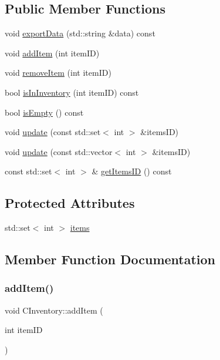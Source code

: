 \subsection*{Public Member Functions}
\begin{DoxyCompactItemize}
\item 
void \mbox{\hyperlink{class_c_inventory_aaf1332bfb30866845bbcae69e411e4bc}{export\+Data}} (std\+::string \&data) const
\item 
void \mbox{\hyperlink{class_c_inventory_aee94ee18f40ea685f640a15f8f6f75b9}{add\+Item}} (int item\+ID)
\item 
void \mbox{\hyperlink{class_c_inventory_a0df34d3e77a17faa6585c11611258135}{remove\+Item}} (int item\+ID)
\item 
bool \mbox{\hyperlink{class_c_inventory_abd92c94b31dc928c1047423e98309bd7}{is\+In\+Inventory}} (int item\+ID) const
\item 
bool \mbox{\hyperlink{class_c_inventory_a3fe6ee0c2de70f3e2d9278e43f125fe9}{is\+Empty}} () const
\item 
void \mbox{\hyperlink{class_c_inventory_a2ae39f69247c25fa2ee46c4111bcce56}{update}} (const std\+::set$<$ int $>$ \&items\+ID)
\item 
void \mbox{\hyperlink{class_c_inventory_a0e551d2fbd87a61bb2b56ce58cacbe1f}{update}} (const std\+::vector$<$ int $>$ \&items\+ID)
\item 
const std\+::set$<$ int $>$ \& \mbox{\hyperlink{class_c_inventory_a473699b2949d4c6c19853f5047fa7737}{get\+Items\+ID}} () const
\end{DoxyCompactItemize}
\subsection*{Protected Attributes}
\begin{DoxyCompactItemize}
\item 
std\+::set$<$ int $>$ \mbox{\hyperlink{class_c_inventory_a6e8d618c0236a8221a876466b53e4ddb}{items}}
\end{DoxyCompactItemize}


\subsection{Member Function Documentation}
\mbox{\label{class_c_inventory_aee94ee18f40ea685f640a15f8f6f75b9}} 
\subsubsection{\texorpdfstring{add\+Item()}{addItem()}}
{\footnotesize\ttfamily void C\+Inventory\+::add\+Item (\begin{DoxyParamCaption}\item[{int}]{item\+ID }\end{DoxyParamCaption})\hspace{0.3cm}{\ttfamily [inline]}}

